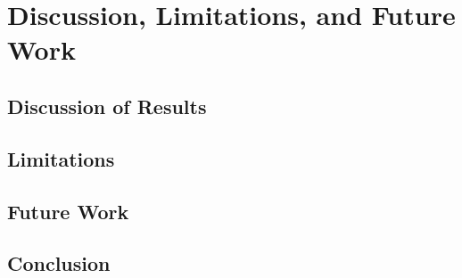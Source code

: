 %

\chapter{Discussion, Limitations, and Future Work}

\section{Discussion of Results}

\section{Limitations}

\section{Future Work}

\section{Conclusion}
